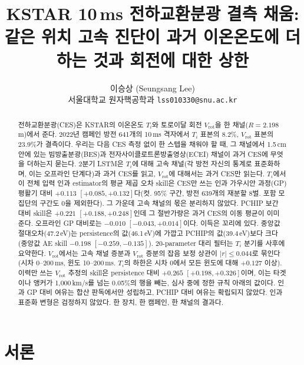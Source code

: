 \documentclass[10pt,twocolumn,letterpaper]{article}
\title{\vspace{-0.3in}\large\textbf{KSTAR 10\,ms 전하교환분광 결측 채움:
같은 위치 고속 진단이 과거 이온온도에 더하는 것과
회전에 대한 상한}}
\author{이승상 (Seungsang Lee)\\
  {\small 서울대학교 원자핵공학과}\quad
  {\small\texttt{lss010330@snu.ac.kr}}}
\date{\vspace{-0.25in}}
\newcommand{\Ti}{\ensuremath{T_i}}
\newcommand{\Vrot}{\ensuremath{V_\mathrm{rot}}}
\begin{document}
\maketitle

\begin{abstract}
전하교환분광(CES)은 KSTAR의 이온온도 \Ti{}와 토로이달 회전 \Vrot{}을 한 채널($R =
2.198$\,m)에서 준다. 2022년 캠페인 방전 641개의 10\,ms 격자에서 \Ti{} 표본의 8.2\%,
\Vrot{} 표본의 23.9\%가 결측이다. 우리는 다음 CES 측정 없이 한 스텝을 채워야 할 때, 그
채널에서 1.5\,cm 안에 있는 빔방출분광(BES)과 전자사이클로트론방출영상(ECEI) 채널이 과거
CES에 무엇을 더하는지 묻는다. 2분기 LSTM은 \Ti{}에 대해 고속 채널(각 방전 자신의 통계로
표준화하며, 이는 오프라인 단계다)과 과거 CES를 읽고, \Vrot{}에 대해서는 과거 CES만 읽는다.
\Ti{}에서 이 전체 입력 인과 estimator의 평균 제곱 오차 skill은 CES만 쓰는 인과 가우시안
과정(GP) 평활기 대비 $+0.113$ $[+0.085, +0.132]$다(컷. 95\% 구간, 방전 639개의 재분할 8벌.
포함 모집단의 구간도 0을 제외한다). 그 가운데 고속 채널의 몫은 분리하지 않았다. PCHIP 보간
대비 skill은 $+0.221$ $[+0.188, +0.248]$인데 그 절반가량은 과거 CES의 이동 평균이 이미
준다. 오프라인 GP 대비로는 $-0.010$ $[-0.043, +0.014]$이다. 이득은 꼬리에 있다. 중앙값
절대오차(47.2\,eV)는 persistence의 값(46.1\,eV)에 가깝고 PCHIP의 값(39.4\,eV)보다 크다
(중앙값 AE skill $-0.198$ $[-0.259, -0.135]$). 20-parameter 대리 필터는 \Ti{} 분기를 사후에
요약한다. \Vrot{}에서는 고속 채널 증분과 \Vrot{} 증분의 잡음 보정 상관이 $|r| \leq 0.044$로
묶인다(시차 0--200\,ms, 윈도 10--200\,ms. \Ti{}의 하한은 시차 0에서 모든 윈도에 대해
$+0.127$ 이상). 이력만 쓰는 \Vrot{} 추정의 skill은 persistence 대비 $+0.265$ $[+0.198, +0.326]$이며,
이는 타겟이나 앵커가 1{,}000\,km/s를 넘는 0.05\%의 행을 빼는, 심사 중에 정한 규칙 아래의
값이다. 인과 GP 대비 여유는 합산 판독에서만 성립하고, PCHIP 대비 여유는 확립되지 않았다.
인과 표준화 변형은 검정하지 않았다. 한 장치, 한 캠페인, 한 채널의 결과다.
\end{abstract}

\section{서론}
\label{sec:intro}
\end{document}
